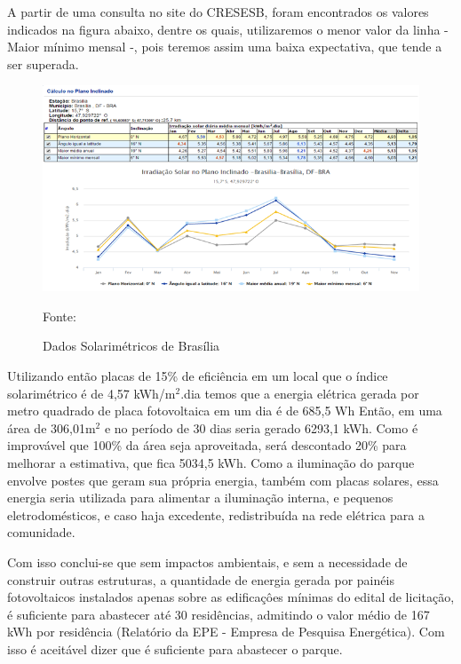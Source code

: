 A partir de uma consulta no site do CRESESB, foram encontrados os valores indicados na figura abaixo, dentre os quais, utilizaremos o menor valor da linha - Maior m\'inimo mensal -, pois teremos assim uma baixa expectativa, que tende a ser superada.

\begin{figure}[H]
	\centering
	\label{Calculo Plano Inclinado}
		\includegraphics[keepaspectratio=true,scale=0.7]{planejamento/CalculoPlanoInclinado.png}
	\caption{Dados Solarim\'etricos de Bras\'ilia}
	\small{Fonte:  \cite{CRESESBIMAGEM} }
\end{figure}

Utilizando ent\~ao placas de 15\% de efici\^encia em um local que o \'indice solarim\'etrico \'e de 4,57 kWh/m$^{2}$.dia temos que a energia el\'etrica gerada por metro quadrado de placa fotovoltaica em um dia \'e de 685,5 Wh Ent\~ao, em uma \'area de 306,01m$^{2}$ e no per\'iodo de 30 dias seria gerado 6293,1 kWh. Como \'e improv\'avel que 100\% da \'area seja aproveitada, ser\'a descontado 20\% para melhorar a estimativa, que fica 5034,5 kWh. Como a ilumina\c{c}\~ao do parque envolve postes que geram sua pr\'opria energia, tamb\'em com placas solares, essa energia seria utilizada para alimentar a ilumina\c{c}\~ao interna, e pequenos eletrodom\'esticos, e caso haja excedente, redistribu\'ida na rede el\'etrica para a comunidade.

Com isso conclui-se que sem impactos ambientais, e sem a necessidade de construir outras estruturas, a quantidade de energia gerada por pain\'eis fotovoltaicos instalados apenas sobre as edifica\c{c}\^oes m\'inimas do edital de licita\c{c}\~ao, \'e suficiente para abastecer at\'e 30 resid\^encias, admitindo o valor m\'edio de 167 kWh por resid\^encia (Relat\'orio da EPE - Empresa de Pesquisa Energ\'etica). Com isso \'e aceit\'avel dizer que \'e suficiente para abastecer o parque.

